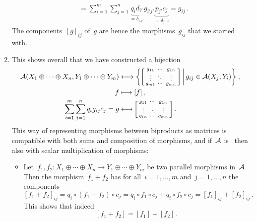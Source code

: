 \begin{remark*}
\begin{enumerate}
\begin{align*}
        &=  \sum_{i=1}^m \sum_{j=1}^n
            \underbrace{q_i d_{i'}}_{= \delta_{i,i'}} g_{i'j'} \underbrace{p_{j'} c_j}_{= \delta_{j',j}}
        =  g_{ij} \,.
      \end{align*}
      The components~$[g]_{ij}$ of~$g$ are hence the morphisms~$g_{ij}$ that we started with.
    \item
      This shows overall that we have constructed a bijection
      \begin{align*}
          \Acat(X_1 \oplus \dotsb \oplus X_n, Y_1 \oplus \dotsb \oplus Y_m)
        &\longleftrightarrow
          \left\{
            \begin{bsmallmatrix}
              g_{11}  & \cdots  & g_{1n}  \\
              \vdots  & \ddots  & \vdots  \\
              g_{m1}  & \cdots  & g_{mn}
            \end{bsmallmatrix}
          \suchthat*
            g_{ij} \in \Acat(X_j, Y_i)
          \right\}  \,,
        \\
          f
        &\longmapsto
          [f] \,,
        \\
          \sum_{i=1}^m \sum_{j=1}^n q_i g_{ij} c_j
        =
          g
        &\longmapsfrom
          \begin{bsmallmatrix}
              g_{11}  & \cdots  & g_{1n}  \\
              \vdots  & \ddots  & \vdots  \\
              g_{1n}  & \cdots  & g_{mn}
            \end{bsmallmatrix}  \,.
      \end{align*}
      This way of representing morphisms between biproducts as matrices is compatible with both sums and composition of morphisms, and if~$\mathcal{A}$ is~{\preklin} then also with scalar multiplication of morphisms:
      \begin{itemize}
        \item
          Let~$f_1, f_2 \colon X_1 \oplus \dotsb \oplus X_n \to Y_1 \oplus \dotsb \oplus Y_m$ be two parallel morphisms in~$\mathcal{A}$.
          Then the morphism~$f_1 + f_2$ has for all~$i = 1, \dotsc, m$ and~$j = 1, \dotsc, n$ the components
          \[
              [f_1 + f_2]_{ij}
            = q_i \circ (f_1 + f_2) \circ c_j
            = q_i \circ f_1 \circ c_j + q_i \circ f_2 \circ c_j
            = [f_1]_{ij} + [f_2]_{ij} \,.
          \]
          This shows that indeed
          \[
              [f_1 + f_2]
            = [f_1] + [f_2] \,.
\]
\end{itemize}
\end{enumerate}
\end{remark*}
